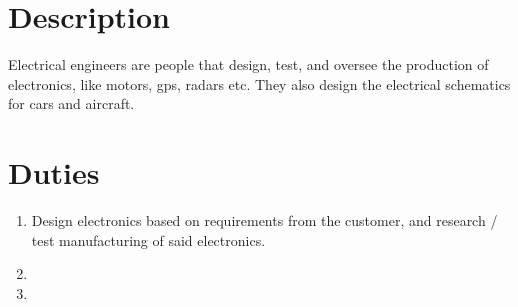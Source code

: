 \documentclass[11pt]{article}
\author{Alex Morin}
\date{\today}
\title{}
\begin{document}
\section*{Description}
\label{sec:org82c603c}
Electrical engineers are people that design, test, and oversee the production of electronics, like motors, gps, radars etc.  They also design the electrical schematics for cars and aircraft.

\section*{Duties}
\label{sec:org5682deb}
\begin{enumerate}
\item Design electronics based on requirements from the customer, and research / test manufacturing of said electronics.
\item 

\item 
\end{enumerate}
\end{document}
